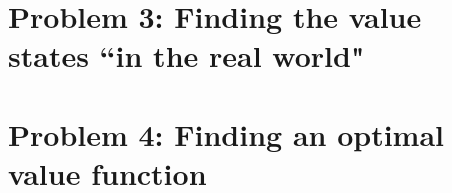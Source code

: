 \documentclass[twoside,11pt]{homework}
\DeclarePairedDelimiter{\2norm}{\lVert}{\rVert^2_2}
\newcommand{\1}[1]{\mathds{1}\left[#1\right]}
\begin{document}
%


\section*{\large Problem 3: Finding the value states ``in the real world"}


\section*{\large Problem 4: Finding an optimal value function}
\end{document}
